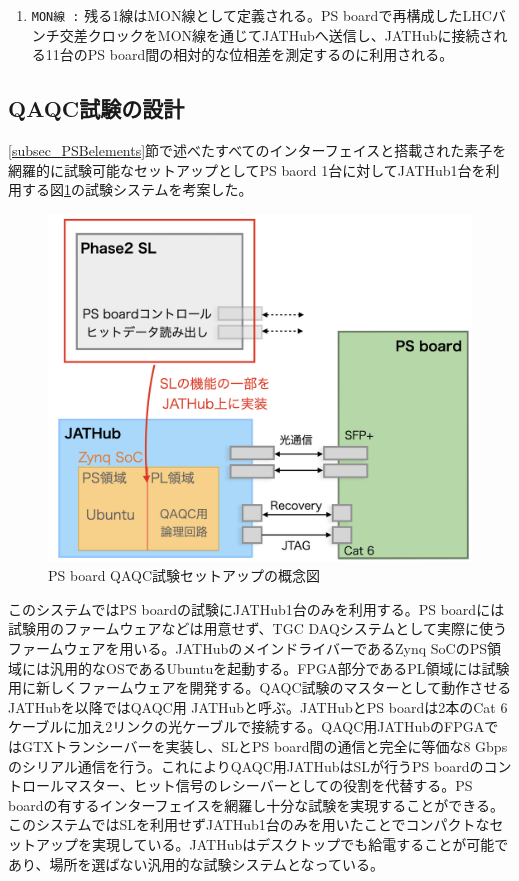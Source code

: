 \begin{enumerate}
    \item \texttt{MON線 :} 残る1線はMON線として定義される。PS boardで再構成したLHCバンチ交差クロックをMON線を通じてJATHubへ送信し、JATHubに接続される11台のPS board間の相対的な位相差を測定するのに利用される。
    \baselineskip
\end{enumerate}

\subsection{QAQC試験の設計}
\label{subsec_QAQCdesign}
\ref{subsec_PSBelements}節で述べたすべてのインターフェイスと搭載された素子を網羅的に試験可能なセットアップとしてPS baord 1台に対してJATHub1台を利用する図\ref{PSBtestdesign}の試験システムを考案した。

\begin{figure} 
\centering
\includegraphics[width=16cm]{fig/QAQC/PSBtestdesign.png}
\caption[PS board QAQC試験セットアップの概念図]{PS board QAQC試験セットアップの概念図}
\label{PSBtestdesign}
\end{figure}

このシステムではPS boardの試験にJATHub1台のみを利用する。PS boardには試験用のファームウェアなどは用意せず、TGC DAQシステムとして実際に使うファームウェアを用いる。JATHubのメインドライバーであるZynq SoCのPS領域には汎用的なOSであるUbuntuを起動する。FPGA部分であるPL領域には試験用に新しくファームウェアを開発する。QAQC試験のマスターとして動作させるJATHubを以降ではQAQC用 JATHubと呼ぶ。JATHubとPS boardは2本のCat 6ケーブルに加え2リンクの光ケーブルで接続する。QAQC用JATHubのFPGAではGTXトランシーバーを実装し、SLとPS board間の通信と完全に等価な8 Gbpsのシリアル通信を行う。これによりQAQC用JATHubはSLが行うPS boardのコントロールマスター、ヒット信号のレシーバーとしての役割を代替する。PS boardの有するインターフェイスを網羅し十分な試験を実現することができる。このシステムではSLを利用せずJATHub1台のみを用いたことでコンパクトなセットアップを実現している。JATHubはデスクトップでも給電することが可能であり、場所を選ばない汎用的な試験システムとなっている。\par

